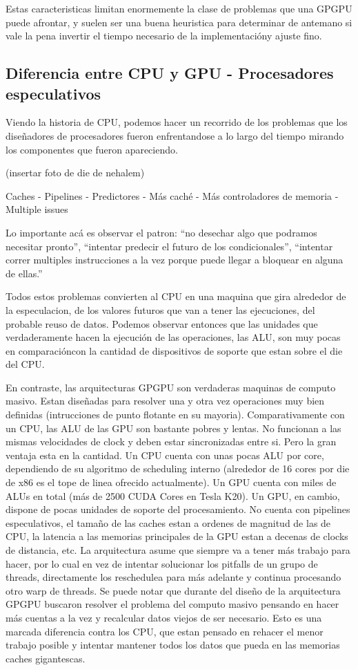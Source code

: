 Estas caracteristicas limitan enormemente la clase de problemas que una GPGPU puede
afrontar, y suelen ser una buena heuristica para determinar de antemano si vale la pena
invertir el tiempo necesario de la implementaci\'ony ajuste fino.


\subsection{Diferencia entre CPU y GPU - Procesadores especulativos}
Viendo la historia de CPU, podemos hacer un recorrido de los problemas que los dise\~nadores de procesadores
fueron enfrentandose a lo largo del tiempo mirando los componentes que fueron apareciendo.

(insertar foto de die de nehalem)

Caches - Pipelines - Predictores - M\'as cach\'e - M\'as controladores de memoria - Multiple issues

Lo importante ac\'a es observar el patron: ``no desechar algo que podramos necesitar pronto'',
``intentar predecir el futuro de los condicionales'', ``intentar correr multiples instrucciones a la vez
porque puede llegar a bloquear en alguna de ellas.''

Todos estos problemas convierten al CPU en una maquina que gira alrededor de la especulacion,
de los valores futuros que van a tener las ejecuciones, del probable reuso de datos.
Podemos observar entonces que las unidades que verdaderamente hacen la ejecuci\'on de las operaciones,
las ALU, son muy pocas en comparaci\'oncon la cantidad de dispositivos de soporte que estan
sobre el die del CPU.

En contraste, las arquitecturas GPGPU son verdaderas maquinas de computo masivo. Estan dise\~nadas para
resolver una y otra vez operaciones muy bien definidas (intrucciones de punto flotante en su mayoria).
Comparativamente con un CPU, las ALU de las GPU son bastante pobres y lentas. No funcionan a las mismas
velocidades de clock y deben estar sincronizadas entre si. Pero la gran ventaja esta en la cantidad.
Un CPU cuenta con unas pocas ALU por core, dependiendo de su algoritmo de scheduling interno
(alrededor de 16 cores por die de x86 es el tope de linea ofrecido actualmente). Un GPU cuenta con miles de ALUs en total
(m\'as de 2500 CUDA Cores en Tesla K20). Un GPU, en cambio, dispone de pocas unidades de soporte del procesamiento.
No cuenta con pipelines especulativos, el tama\~no de las caches
estan a ordenes de magnitud de las de CPU, la latencia a las memorias principales de la GPU estan a
decenas de clocks de distancia, etc. La arquitectura asume que siempre va a tener m\'as trabajo
para hacer, por lo cual en vez de intentar solucionar los pitfalls de un grupo de threads, directamente
los reschedulea para m\'as adelante y continua procesando otro warp de threads. Se puede notar que durante del
dise\~no de la arquitectura GPGPU buscaron resolver el problema del computo masivo pensando en hacer
m\'as cuentas a la vez y recalcular datos viejos de ser necesario. Esto es una marcada diferencia contra
los CPU, que estan pensado en rehacer el menor trabajo posible y intentar mantener todos los datos que pueda en
las memorias caches gigantescas.

